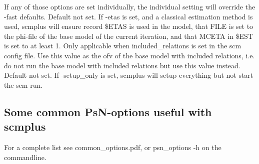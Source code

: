 \documentclass[hideglossary,notoc,hidelof,hidelot,hideTheSignaturePage,hideLinkCurrent,hideloa,pdfLatex,noClient,notitle]{PMXstyle-20170118kajsa4}
\begin{document}
\begin{optionlist}
If any of those options are set individually, the individual setting will override the
-fast defaults.
\nextopt
{}
Default not set. 
If -etas is set, and a classical estimation method is used, scmplus will ensure record \$ETAS is used
in the model, that FILE is set to the phi-file of the base model of the current iteration,
and that MCETA in \$EST is set to at least 1.
\nextopt
{}
Only applicable when included\_relations is set in the scm config file.
Use this value as the ofv of the base model with included relations,
i.e. do not run the base model with included relations but use
this value instead.
\nextopt
{}
Default not set. 
If -setup\_only is set, scmplus will setup everything but not start the scm run.
\nextopt
\end{optionlist}

\subsection{Some common PsN-options useful with scmplus}
For a complete list see common\_options.pdf, or psn\_options -h on the commandline.


\end{document}
